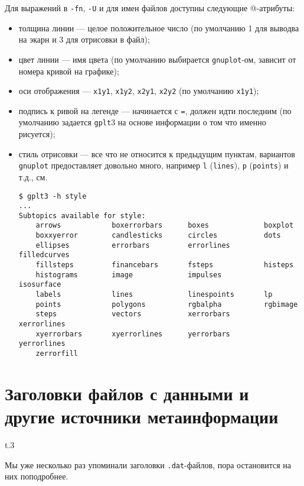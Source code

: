 \documentclass[12pt]{article}
\def\gplt{{\tt gplt}}
\def\gnuplot{{\tt gnuplot}}
\begin{document}
Для выражений в \verb'-fn', \verb'-U' и для имен файлов доступны следующие @-атрибуты:
\begin{itemize}
\item толщина линии --- целое положительное число (по умолчанию 1 для выводва на экарн и 3 для отрисовки в файл);
\item цвет линии --- имя цвета (по умолчанию выбирается \gnuplot-ом, зависит от номера кривой на графике);
\item оси отображения --- \verb'x1y1', \verb'x1y2', \verb'x2y1', \verb'x2y2' (по умолчанию \verb'x1y1');
\item подпись к ривой на легенде --- начинается с \verb'=', должен идти последним (по умолчанию задается \gplt3{} на основе информации о том что именно рисуется);
\item стиль отрисовки --- все что не относится к предыдущим пунктам, вариантов \gnuplot{} предоставляет довольно много, например \verb'l' (\verb'lines'),
  \verb'p' (\verb'points') и т.д., см.
\begin{verbatim}
$ gplt3 -h style
...
Subtopics available for style:
    arrows            boxerrorbars      boxes             boxplot
    boxxyerror        candlesticks      circles           dots
    ellipses          errorbars         errorlines        filledcurves
    fillsteps         financebars       fsteps            histeps
    histograms        image             impulses          isosurface
    labels            lines             linespoints       lp
    points            polygons          rgbalpha          rgbimage
    steps             vectors           xerrorbars        xerrorlines
    xyerrorbars       xyerrorlines      yerrorbars        yerrorlines
    zerrorfill
\end{verbatim}
\end{itemize}

\section{Заголовки файлов с данными и другие источники метаинформации}
\begin{wrapfigure}[5]{t}{.3\textwidth}
  \vphantom{.}
  \vspace{-1.2cm}

\end{wrapfigure}
Мы уже несколько раз упоминали заголовки \verb'.dat'-файлов, пора остановится на них поподробнее.
\end{document}
